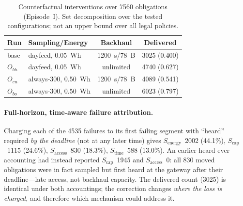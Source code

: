 \documentclass[11pt]{article}
\newcommand{\stime}{$S_{\mathrm{time}}$\xspace}
\newcommand{\scap}{$S_{\mathrm{cap}}$\xspace}
\newcommand{\senergy}{$S_{\mathrm{energy}}$\xspace}
\newcommand{\saccess}{$S_{\mathrm{access}}$\xspace}
\begin{document}
\begin{table}[h]
\centering\small
\begin{tabular}{llcc}
\toprule
Run & Sampling/Energy & Backhaul & Delivered \\
\midrule
base & dayfeed, 0.05~Wh & 1200~s/78~B & 3025 (0.400)\\
$O_{bh}$ & dayfeed, 0.05~Wh & unlimited & 4740 (0.627)\\
$O_{en}$ & always-300, 0.50~Wh & 1200~s/78~B & 4089 (0.541)\\
$O_{bo}$ & always-300, 0.50~Wh & unlimited & 6023 (0.797)\\
\bottomrule
\end{tabular}
\caption{Counterfactual interventions over 7560 obligations (Episode~I). Set decomposition over
the tested configurations; not an upper bound over all legal policies.}
\label{tab:walls}
\end{table}

\paragraph{Full-horizon, time-aware failure attribution.}
Charging each of the 4535 failures to its first failing segment with ``heard'' required
\emph{by the deadline} (not at any later time) gives \senergy\ 2002 (44.1\%), \scap\ 1115 (24.6\%),
\saccess\ 830 (18.3\%), \stime\ 588 (13.0\%). An earlier heard-ever accounting had instead reported
\scap\ 1945 and \saccess\ 0: all 830 moved obligations were in fact sampled but first heard at the
gateway after their deadline---late access, not backhaul capacity. The delivered count (3025) is
identical under both accountings; the correction changes \emph{where the loss is charged}, and
therefore which mechanism could address it.
\end{document}
